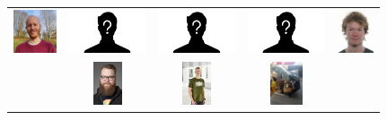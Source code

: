 \documentclass[usenames,dvipsnames,aspectratio=169,12pt]{beamer}
\begin{document}
\begin{frame}
\begin{figure}
\begin{tabular}{ccccc}
    {\includegraphics[height = 0.5in]{jeppe.png}}      &
    {\includegraphics[height = 0.5in]{aina.png}}       &
    {\includegraphics[height = 0.5in]{jakob.png}}      &
    {\includegraphics[height = 0.5in]{marit.png}}      &
    {\includegraphics[height = 0.5in]{mathias.jpg}}   \\
                                                       &
    {\includegraphics[height = 0.5in]{lau.jpg}}        &
    {\includegraphics[height = 0.5in]{soeren.jpg}}     &
    {\includegraphics[height = 0.5in]{betterme.jpg}}   &
    \end{tabular}
  \end{figure}
\end{frame}
\end{document}
